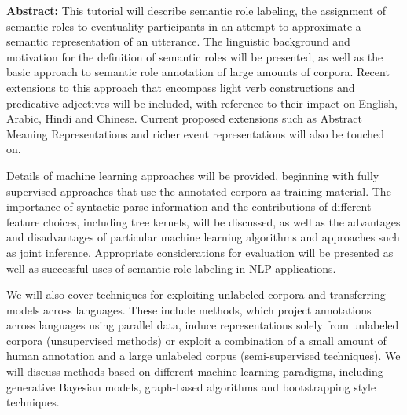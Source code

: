 \noindent
{\bfseries Abstract:} This tutorial will describe semantic role labeling, the assignment of semantic roles to eventuality participants in an attempt to approximate a semantic representation of an utterance. The linguistic background and motivation for the definition of semantic roles will be presented, as well as the basic approach to semantic role annotation of large amounts of corpora. Recent extensions to this approach that encompass light verb constructions and predicative adjectives will be included, with reference to their impact on English, Arabic, Hindi and Chinese. Current proposed extensions such as Abstract Meaning Representations and richer event representations will also be touched on.

Details of machine learning approaches will be provided, beginning with fully supervised approaches that use the annotated corpora as training material. The importance of syntactic parse information and the contributions of different feature choices, including tree kernels, will be discussed, as well as the advantages and disadvantages of particular machine learning algorithms and approaches such as joint inference. Appropriate considerations for evaluation will be presented as well as successful uses of semantic role labeling in NLP applications.

We will also cover techniques for exploiting unlabeled corpora and transferring models across languages. These include methods, which project annotations across languages using parallel data, induce representations solely from unlabeled corpora (unsupervised methods) or exploit a combination of a small amount of human annotation and a large unlabeled corpus (semi-supervised techniques). We will discuss methods based on different machine learning paradigms, including generative Bayesian models, graph-based algorithms and bootstrapping style techniques.
